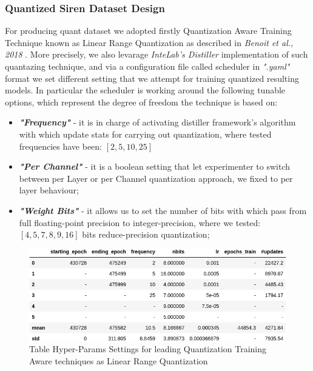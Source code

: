 


\begin{frame}
\frametitle{Quantized Siren Dataset Design}
For producing quant dataset we adopted firstly Quantization Aware Training Technique known as Linear Range Quantization as described in \textit{ Benoit et al., 2018 }. More precisely,
we also levarage \textit{InteLab's Distiller} implementation of such quantazing technique, and via a configuration file called scheduler in \textit{".yaml"} format we set different
setting that we attempt for training quantized resulting models. In particular the scheduler is working around the following tunable options, which represent the degree of freedom
the technique is based on:
\begin{itemize}
\item \textbf{\textit{"Frequency"}} - it is in charge of activating distiller framework's algorithm with which update stats for carrying out quantization,
where tested frequencies have been: $[2,5,10,25]$
\item \textbf{\textit{"Per Channel"}} - it is a boolean setting that let experimenter to switch between per Layer or per Channel quantization approach, we fixed to per layer behaviour;
\item \textbf{\textit{"Weight Bits"}} - it allows us to set the number of bits with which pass from full floating-point precision to integer-precision,
where we tested: $[4,5,7,8,9,16]$ bits reduce-precision quantization;
\end{itemize}


\begin{figure}
\includegraphics[scale=0.2]{slides/experiments/quant_dataset/listed_hyper_params_sets.png}
\caption{Table Hyper-Params Settings for leading Quantization Training Aware techniques as Linear Range Quantization}
\end{figure}

\end{frame}

